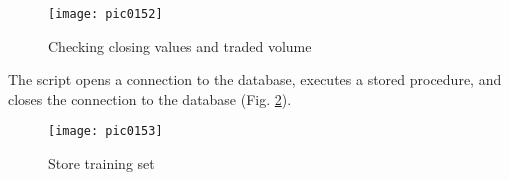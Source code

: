\begin{figure}[h]
\centering
\texttt{[image: pic0152]}
\caption{Checking closing values and traded volume}
\label{fig:pic0152}
\end{figure}
\FloatBarrier

The script opens a connection to the database, executes a stored procedure, and closes the connection to the database (Fig. \ref{fig:pic0153}).

\begin{figure}[h]
\centering
\texttt{[image: pic0153]}
\caption{Store training set}
\label{fig:pic0153}
\end{figure}
\FloatBarrier
